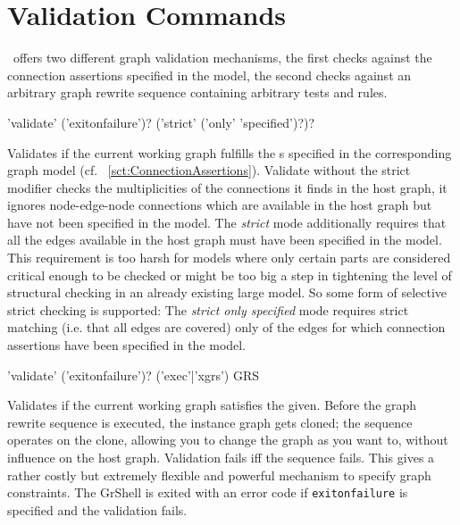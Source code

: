 \section{Validation Commands}\label{sec:validate}

\GrG\ offers two different graph validation mechanisms,
the first checks against the connection assertions specified in the model,
the second checks against an arbitrary graph rewrite sequence containing arbitrary tests and rules.

\begin{rail}
  'validate' ('exitonfailure')? ('strict' ('only' 'specified')?)?
\end{rail}
Validates if the current working graph fulfills the s specified in the corresponding graph model (cf. ~\ref{sct:ConnectionAssertions}).
Validate without the strict modifier checks the multiplicities of the connections it finds in the host graph,
it ignores node-edge-node connections which are available in the host graph but have not been specified in the model.
The \emph{strict} mode additionally requires that all the edges available in the host graph must have been specified in the model.
This requirement is too harsh for models where only certain parts are considered critical enough to be checked
or might be too big a step in tightening the level of structural checking in an already existing large model.
So some form of selective strict checking is supported:
The \emph{strict only specified} mode requires strict matching (i.e. that all edges are covered) only of the edges for which connection assertions have been specified in the model.

\begin{rail}
  'validate' ('exitonfailure')? ('exec'|'xgrs') GRS
\end{rail}
Validates if the current working graph satisfies the  given.
Before the graph rewrite sequence is executed, the instance graph gets cloned;
the sequence operates on the clone, allowing you to change the graph as you want to, without influence on the host graph.
Validation fails iff the sequence fails.
This gives a rather costly but extremely flexible and powerful mechanism to specify graph constraints.
The GrShell is exited with an error code if \texttt{exitonfailure} is specified and the validation fails.

